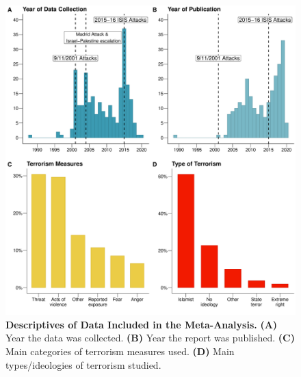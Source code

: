 \begin{figure}[H]
\centering
\includegraphics[width=\textwidth]{Chapter_5/art4-figure2.pdf}
\caption[Descriptives of Data Included in the Meta-Analysis]{\textbf{Descriptives of Data Included in the Meta-Analysis.} \textbf{(A)} Year the data was collected. \textbf{(B)} Year the report was published. \textbf{(C)} Main categories of terrorism measures used. \textbf{(D)} Main types/ideologies of terrorism studied.}
\label{fig:art4-fig2}
\end{figure}


